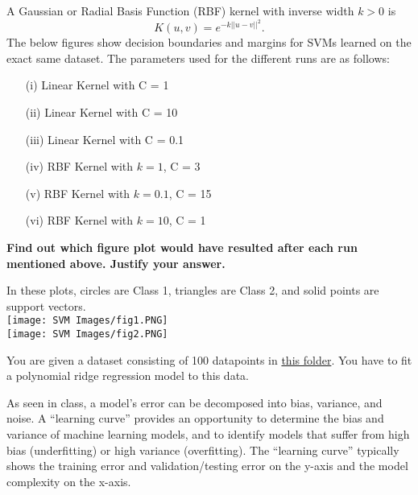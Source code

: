 \documentclass[solution,addpoints,12pt]{exam}
\begin{document}
\begin{questions}
 A Gaussian or Radial Basis Function (RBF) kernel with inverse width $k>0$ is 
\begin{equation*}
    K(u,v)  = e^{-k||u-v||^2}.
\end{equation*}
The below figures show decision boundaries and margins for SVMs learned on the exact same dataset. The parameters used for the different runs are as follows:
\begin{enumerate}
\item[(i)] Linear Kernel with C = 1
\item[(ii)] Linear Kernel with C = 10
\item[(iii)] Linear Kernel with C = 0.1
\item[(iv)] RBF Kernel with  $k=1$, C = 3
\item[(v)] RBF Kernel with $k=0.1$, C = 15
\item[(vi)] RBF Kernel with $k=10$, C = 1
\end{enumerate}
{\bf Find out which figure plot would have resulted after each run mentioned above. Justify your answer.}

In these plots, circles are Class 1, triangles are Class 2, and solid points are support vectors.\\
\texttt{[image: SVM Images/fig1.PNG]}\\
\texttt{[image: SVM Images/fig2.PNG]}
\begin{solution}
\end{solution}


You are given a dataset consisting of 100 datapoints in \href{https://drive.google.com/drive/folders/1FGEPZnzeK6SvoNVMRIj834ORsT0YMjtk?usp=sharing}{this folder}. You have to fit a polynomial ridge regression model to this data.

As seen in class, a model's error can be decomposed into bias, variance, and noise. A ``learning curve'' provides an opportunity to determine the bias and variance of machine learning models, and to identify models that suffer from high bias (underfitting) or high variance (overfitting). The ``learning curve'' typically shows the training error and validation/testing error on the y-axis and the model complexity on the x-axis. 

\end{questions}
\end{document}
